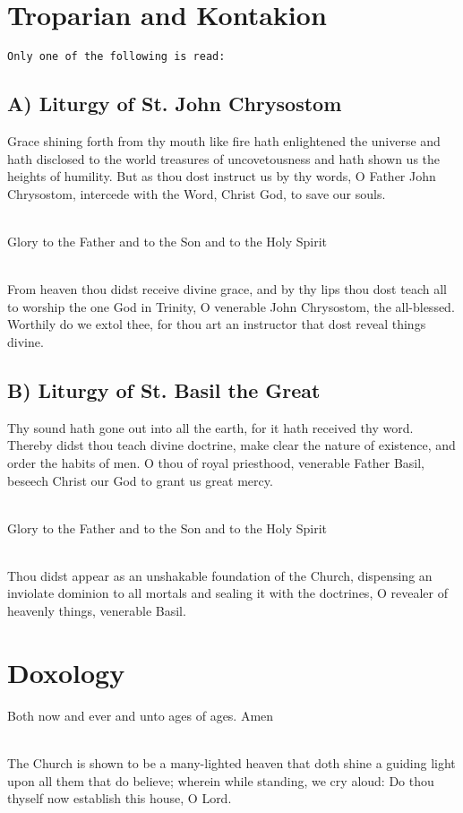 \section*{Troparian and Kontakion}
\texttt{Only one of the following is read:}

\subsection*{A) Liturgy of St. John Chrysostom}
Grace shining forth from thy mouth like fire hath enlightened the universe
and hath disclosed to the world treasures of uncovetousness and hath shown
us the heights of humility.
But as thou dost instruct us by thy words,
O Father John Chrysostom, intercede with the Word,
Christ God, to save our souls.

\mbox{}\\
Glory to the Father and to the Son and to the Holy Spirit

\mbox{}\\
From heaven thou didst receive divine grace,
and by thy lips thou dost teach all to worship the one God in Trinity,
O venerable John Chrysostom,
the all-blessed.
Worthily do we extol thee,
for thou art an instructor that dost reveal things divine.

\subsection*{B) Liturgy of St. Basil the Great}
Thy sound hath gone out into all the earth, for it hath received thy word.
Thereby didst thou teach divine doctrine,
make clear the nature of existence,
and order the habits of men.
O thou of royal priesthood,
venerable Father Basil,
beseech Christ our God to grant us great mercy.

\mbox{}\\
Glory to the Father and to the Son and to the Holy Spirit

\mbox{}\\
Thou didst appear as an unshakable foundation of the Church,
dispensing an inviolate dominion to all mortals and sealing it with the
doctrines,
O revealer of heavenly things,
venerable Basil.

\section*{Doxology}

Both now and ever and unto ages of ages. Amen

\mbox{}\\
The Church is shown to be a many-lighted heaven that doth shine a guiding
light upon all them that do believe;
wherein while standing, we cry aloud:
Do thou thyself now establish this house, O Lord.

